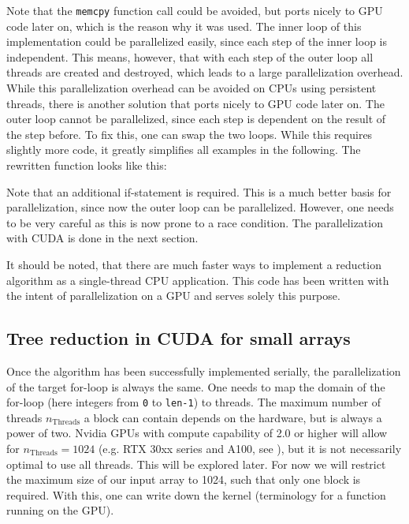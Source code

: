 

Note that the \texttt{memcpy} function call could be avoided, but ports nicely to GPU code later on, which is the reason why it was used.
The inner loop of this implementation could be parallelized easily, since each step of the inner loop is independent.
This means, however, that with each step of the outer loop all threads are created and destroyed, which leads to a large parallelization overhead.
While this parallelization overhead can be avoided on CPUs using persistent threads, there is another solution that ports nicely to GPU code later on.
The outer loop cannot be parallelized, since each step is dependent on the result of the step before.
To fix this, one can swap the two loops.
While this requires slightly more code, it greatly simplifies all examples in the following.
The rewritten function looks like this:



Note that an additional if-statement is required.
This is a much better basis for parallelization, since now the outer loop can be parallelized.
However, one needs to be very careful as this is now prone to a race condition.
The parallelization with CUDA is done in the next section.

It should be noted, that there are much faster ways to implement a reduction algorithm as a single-thread CPU application.
This code has been written with the intent of parallelization on a GPU and serves solely this purpose.

\subsection{Tree reduction in CUDA for small arrays}
Once the algorithm has been successfully implemented serially, the parallelization of the target for-loop is always the same.
One needs to map the domain of the for-loop (here integers from \texttt{0} to \texttt{len-1}) to threads.
The maximum number of threads \( n_{\mathrm{Threads}} \) a block can contain depends on the hardware, but is always a power of two.
Nvidia GPUs with compute capability of 2.0 or higher will allow for \( n_{\mathrm{Threads}} = 1024 \) (e.g. RTX 30xx series and A100, see \cite{programming_guide}), but it is not necessarily optimal to use all threads.
This will be explored later.
For now we will restrict the maximum size of our input array to 1024, such that only one block is required.
With this, one can write down the kernel (terminology for a function running on the GPU).


